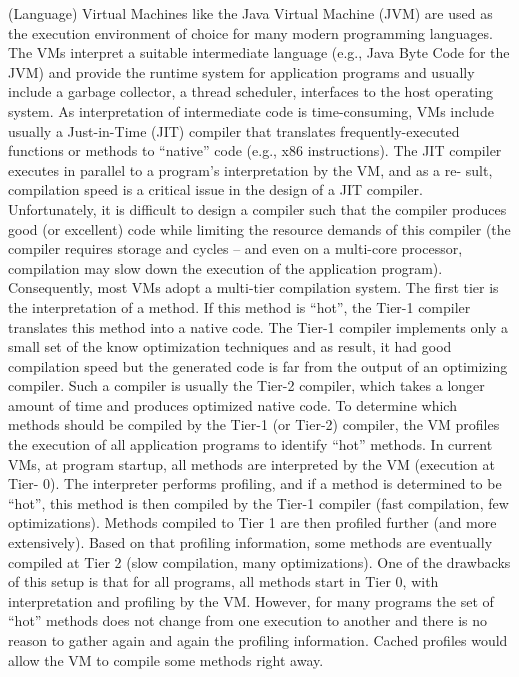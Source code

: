 (Language) Virtual Machines like the Java Virtual Machine (JVM) are used as the execution
environment of choice for many modern programming languages. The VMs interpret a suitable
intermediate language (e.g., Java Byte Code for the JVM) and provide the runtime system
for application programs and usually include a garbage collector, a thread scheduler, interfaces
to the host operating system. As interpretation of intermediate code is time-consuming, VMs
include usually a Just-in-Time (JIT) compiler that translates frequently-executed functions or
methods to “native” code (e.g., x86 instructions).
The JIT compiler executes in parallel to a program’s interpretation by the VM, and as a re-
sult, compilation speed is a critical issue in the design of a JIT compiler. Unfortunately, it is
difficult to design a compiler such that the compiler produces good (or excellent) code while
limiting the resource demands of this compiler (the compiler requires storage and cycles – and
even on a multi-core processor, compilation may slow down the execution of the application
program). Consequently, most VMs adopt a multi-tier compilation system. The first tier is the
interpretation of a method. If this method is “hot”, the Tier-1 compiler translates this method
into a native code. The Tier-1 compiler implements only a small set of the know optimization
techniques and as result, it had good compilation speed but the generated code is far from the
output of an optimizing compiler. Such a compiler is usually the Tier-2 compiler, which takes a
longer amount of time and produces optimized native code. To determine which methods should
be compiled by the Tier-1 (or Tier-2) compiler, the VM profiles the execution of all application
programs to identify “hot” methods.
In current VMs, at program startup, all methods are interpreted by the VM (execution at Tier-
0). The interpreter performs profiling, and if a method is determined to be “hot”, this method is
then compiled by the Tier-1 compiler (fast compilation, few optimizations). Methods compiled
to Tier 1 are then profiled further (and more extensively). Based on that profiling information,
some methods are eventually compiled at Tier 2 (slow compilation, many optimizations).
One of the drawbacks of this setup is that for all programs, all methods start in Tier 0, with
interpretation and profiling by the VM. However, for many programs the set of “hot” methods
does not change from one execution to another and there is no reason to gather again and again
the profiling information. Cached profiles would allow the VM to compile some methods right
away.
